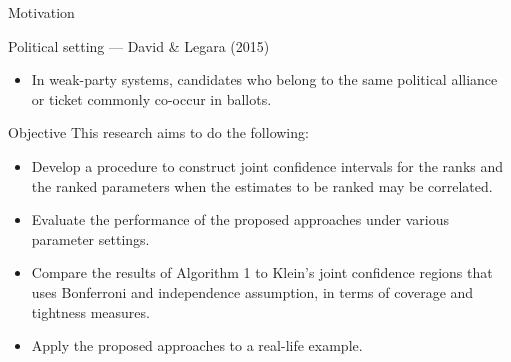 \documentclass[
  11pt,
  ignorenonframetext,
]{beamer}
\providecommand{\tightlist}{%
  \setlength{\itemsep}{0pt}\setlength{\parskip}{0pt}}
\begin{document}
\begin{frame}{Motivation}
\label{motivation-1}
\begin{block}{Political setting --- David \& Legara (2015)}
\label{political-setting-david-legara-2015}
\begin{itemize}[<+->]
\tightlist
\item
  In weak-party systems, candidates who belong to the same political
  alliance or ticket commonly co-occur in ballots.
\end{itemize}

\end{block}
\end{frame}

\begin{frame}{Objective}
\label{objective}
This research aims to do the following:

\begin{itemize}[<+->]
\tightlist
\item
  Develop a procedure to construct joint confidence intervals for the
  ranks and the ranked parameters when the estimates to be ranked may be
  correlated.
\item
  Evaluate the performance of the proposed approaches under various
  parameter settings.
\item
  Compare the results of Algorithm 1 to Klein's joint confidence regions
  that uses Bonferroni and independence assumption, in terms of coverage
  and tightness measures.
\item
  Apply the proposed approaches to a real-life example.
\end{itemize}

\end{frame}
\end{document}
